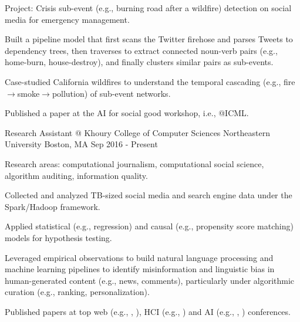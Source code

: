 \documentclass[letterpaper]{awesome-cv}
\begin{document}
\begin{cventries}
{\begin{cvitems}
        \item {Project: Crisis sub-event (e.g., burning road after a wildfire) detection on social media for emergency management.}
        \item {Built a pipeline model that first scans the Twitter firehose and parses Tweets to dependency trees, then traverses to extract connected noun-verb pairs (e.g., home-burn, house-destroy), and finally clusters similar pairs as sub-events.}
        \item {Case-studied California wildfires to understand the temporal cascading (e.g., fire$\to$smoke$\to$pollution) of sub-event networks.}
        \item {Published a paper at the AI for social good workshop, i.e., @ICML.}
      \end{cvitems}
    }
  \cventry
    {Research Assistant @ Khoury College of Computer Sciences}
    {Northeastern University}
    {Boston, MA}
    {Sep 2016 - Present}
    {
      \begin{cvitems}
        \item {Research areas: computational journalism, computational social science, algorithm auditing, information quality.}
        \item {Collected and analyzed TB-sized social media and search engine data under the Spark/Hadoop framework.}
        \item {Applied statistical (e.g., regression) and causal (e.g., propensity score matching) models for hypothesis testing.}
        \item {Leveraged empirical observations to build natural language processing and machine learning pipelines to identify misinformation and linguistic bias in human-generated content (e.g., news, comments), particularly under algorithmic curation (e.g., ranking, personalization).}
        \item {Published  papers at top web (e.g., , ), HCI (e.g., ) and AI (e.g., , ) conferences.}
      \end{cvitems}
    }

\end{cventries}
\end{document}
